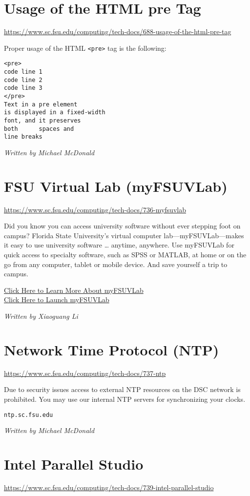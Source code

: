\documentclass[12pt,a4paper]{article}
\begin{document}
\section{Usage of the HTML pre Tag}
\url{https://www.sc.fsu.edu/computing/tech-docs/688-usage-of-the-html-pre-tag}

Proper usage of the HTML \texttt{<pre>} tag is the following:
\begin{verbatim}
<pre>
code line 1
code line 2
code line 3
</pre>
Text in a pre element
is displayed in a fixed-width
font, and it preserves
both      spaces and
line breaks
\end{verbatim}
\hfill \textit{Written by Michael McDonald}

\section{FSU Virtual Lab (myFSUVLab)}
\url{https://www.sc.fsu.edu/computing/tech-docs/736-myfsuvlab}

Did you know you can access university software without ever stepping foot on campus? Florida State University's virtual computer lab—myFSUVLab—makes it easy to use university software … anytime, anywhere. Use myFSUVLab for quick access to specialty software, such as SPSS or MATLAB, at home or on the go from any computer, tablet or mobile device. And save yourself a trip to campus.
\begin{center}
    \href{https://its.fsu.edu/service-catalog/end-point-computing/myfsuvlab}{Click Here to Learn More About myFSUVLab} \\
    \href{https://myfsuvlab.its.fsu.edu/vpn/index.html}{Click Here to Launch myFSUVLab}
\end{center}
\hfill \textit{Written by Xiaoguang Li}

\section{Network Time Protocol (NTP)}
\url{https://www.sc.fsu.edu/computing/tech-docs/737-ntp}

Due to security issues access to external NTP resources on the DSC network is prohibited. You may use our internal NTP servers for synchronizing your clocks.
\begin{center}
    \texttt{ntp.sc.fsu.edu}
\end{center}
\hfill \textit{Written by Michael McDonald}

\section{Intel Parallel Studio}
\url{https://www.sc.fsu.edu/computing/tech-docs/739-intel-parallel-studio}
\end{document}
